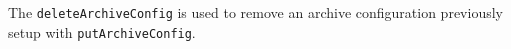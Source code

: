 The \verb+deleteArchiveConfig+ is used to remove an archive configuration previously setup with \verb+putArchiveConfig+.
